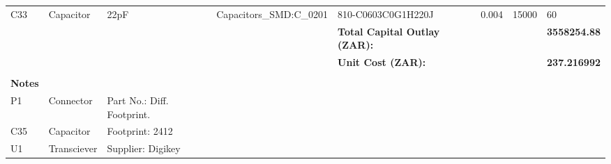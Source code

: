 \begin{landscape}
\begin{table}[]
\begin{tabular}{llllllll}
C33            & Capacitor     & 22pF                       & Capacitors\_SMD:C\_0201         & 810-C0603C0G1H220J                   & 0.004                & 15000           & 60                   \\
               &               &                            &                                 & \textbf{Total Capital Outlay (ZAR):} &                      &                 & \textbf{3558254.88}  \\
               &               &                            &                                 & \textbf{Unit Cost (ZAR):}            &                      &                 & \textbf{237.216992}  \\
               &               &                            &                                 &                                      &                      &                 &                      \\
\textbf{Notes} &               &                            &                                 &                                      &                      &                 &                      \\
P1             & Connector     & Part No.: Diff. Footprint. &                                 &                                      &                      &                 &                      \\
C35            & Capacitor     & Footprint: 2412            &                                 &                                      &                      &                 &                      \\
U1             & Transciever   & Supplier: Digikey          &                                 &                                      &                      &                 &                     
\end{tabular}
\end{table}
\end{landscape}






